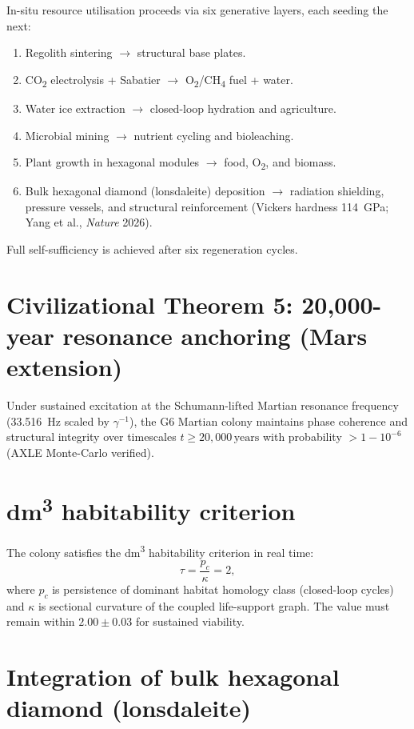 In-situ resource utilisation proceeds via six generative layers, each seeding the next:
\begin{enumerate}
\item Regolith sintering $\to$ structural base plates.
\item CO\textsubscript{2} electrolysis + Sabatier $\to$ O\textsubscript{2}/CH\textsubscript{4} fuel + water.
\item Water ice extraction $\to$ closed-loop hydration and agriculture.
\item Microbial mining $\to$ nutrient cycling and bioleaching.
\item Plant growth in hexagonal modules $\to$ food, O\textsubscript{2}, and biomass.
\item Bulk hexagonal diamond (lonsdaleite) deposition $\to$ radiation shielding, pressure vessels, and structural reinforcement (Vickers hardness 114~GPa; Yang et al., \emph{Nature} 2026).
\end{enumerate}
Full self-sufficiency is achieved after six regeneration cycles.

\section{Civilizational Theorem 5: 20,000-year resonance anchoring (Mars extension)}

\begin{theorem}
Under sustained excitation at the Schumann-lifted Martian resonance frequency (33.516~Hz scaled by \(\gamma^{-1}\)), the G6 Martian colony maintains phase coherence and structural integrity over timescales $t \ge 20{,}000\,\text{years}$ with probability $> 1 - 10^{-6}$ (AXLE Monte-Carlo verified).
\end{theorem}

\section{dm\textsuperscript{3} habitability criterion}

The colony satisfies the dm\textsuperscript{3} habitability criterion in real time:
\[
\tau = \frac{p_c}{\kappa} = 2,
\]
where \(p_c\) is persistence of dominant habitat homology class (closed-loop cycles) and \(\kappa\) is sectional curvature of the coupled life-support graph. The value must remain within $2.00 \pm 0.03$ for sustained viability.

\section{Integration of bulk hexagonal diamond (lonsdaleite)}


